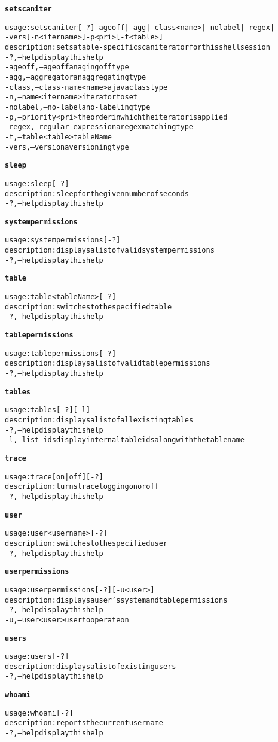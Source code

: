 \begin{alltt}
\textbf{setscaniter}

    usage: setscaniter [-?] -ageoff | -agg | -class <name> | -nolabel | -regex |
    	      -vers  [-n <itername>]  -p <pri>	[-t <table>]
    description: sets a table-specific scan iterator for this shell session
      -?,--help  display this help
      -ageoff,--ageoff  an aging off type
      -agg,--aggregator  an aggregating type
      -class,--class-name <name>  a java class type
      -n,--name <itername>	iterator to set
      -nolabel,--no-label  a no-labeling type
      -p,--priority <pri>  the order in which the iterator is applied
      -regex,--regular-expression  a regex matching type
      -t,--table <table>  tableName
      -vers,--version  a versioning type

\textbf{sleep}

    usage: sleep [-?]
    description: sleep for the given number of seconds
      -?,--help  display this help

\textbf{systempermissions}

    usage: systempermissions [-?]
    description: displays a list of valid system permissions
      -?,--help  display this help

\textbf{table}

    usage: table <tableName> [-?]
    description: switches to the specified table
      -?,--help  display this help

\textbf{tablepermissions}

    usage: tablepermissions [-?]
    description: displays a list of valid table permissions
      -?,--help  display this help

\textbf{tables}

    usage: tables [-?] [-l]
    description: displays a list of all existing tables
      -?,--help  display this help
      -l,--list-ids  display internal table ids along with the table name

\textbf{trace}

    usage: trace [ on | off ] [-?]
    description: turns trace logging on or off
      -?,--help  display this help

\textbf{user}

    usage: user <username> [-?]
    description: switches to the specified user
      -?,--help  display this help

\textbf{userpermissions}

    usage: userpermissions [-?] [-u <user>]
    description: displays a user's system and table permissions
      -?,--help  display this help
      -u,--user <user>  user to operate on

\textbf{users}

    usage: users [-?]
    description: displays a list of existing users
      -?,--help  display this help

\textbf{whoami}

    usage: whoami [-?]
    description: reports the current user name
      -?,--help  display this help


\end{alltt}
